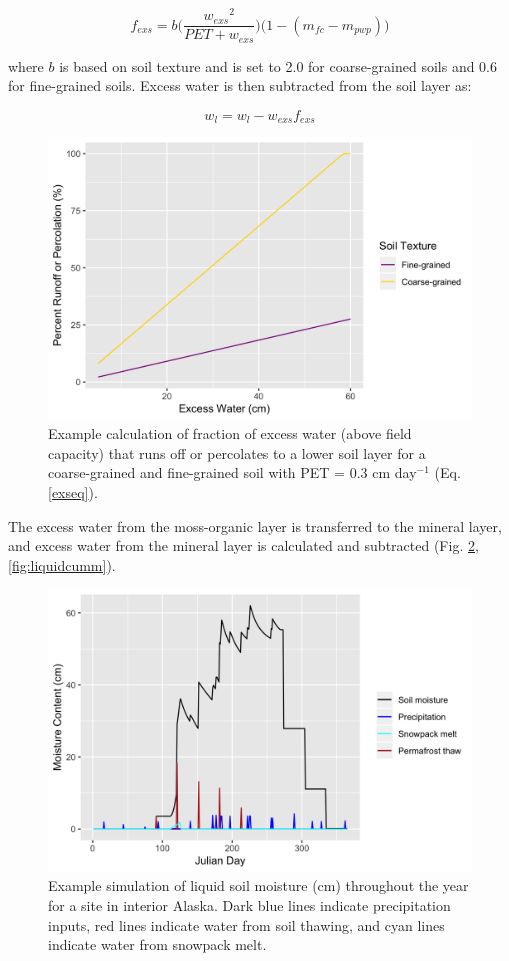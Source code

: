\documentclass[a4paper, 12pt] {report}
\begin{document}
\begin{equation} \label{exseq}
f_{exs} = b\Big(\frac{{w_{exs}}^2}{PET + w_{exs}}\Big)\Big(1 - (m_{fc} - m_{pwp})\Big)
\end{equation}

where $b$ is based on soil texture and is set to 2.0 for coarse-grained soils and 0.6 for fine-grained soils. Excess water is then subtracted from the soil layer as:

\begin{equation} \label{wl}
w_l = w_l - w_{exs}f_{exs}
\end{equation}

\begin{figure}
  \includegraphics[width=0.8\linewidth]{Figures/Exs.png}
  \caption{Example calculation of fraction of excess water (above field capacity) that runs off or percolates to a lower soil layer for a coarse-grained and fine-grained soil with PET = 0.3 cm day$^{-1}$ (Eq. \ref{exseq}).}
  \label{fig:exs}
\end{figure} 

The excess water from the moss-organic layer is transferred to the mineral layer, and excess water from the mineral layer is calculated and subtracted (Fig. \ref{fig:liquid}, \ref{fig:liquidcumm}).

\begin{figure}
  \includegraphics[width=0.8\linewidth]{Figures/Water.png}
  \caption{Example simulation of liquid soil moisture (cm) throughout the year for a site in interior Alaska. Dark blue lines indicate precipitation inputs, red lines indicate water from soil thawing, and cyan lines indicate water from snowpack melt.}
  \label{fig:liquid}
\end{figure}
\end{document}
